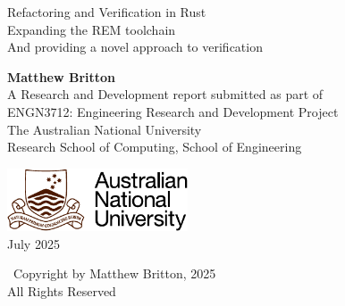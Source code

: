 \documentclass[oneside,onecolumn,12pt,a4paper,openany]{book}
\newcommand{\thesistitle}{Refactoring and Verification in Rust}
\newcommand{\thesistitletwo}{Expanding the REM toolchain }
\newcommand{\thesistitlethree}{And providing a novel approach to verification}
\newcommand{\fullname}{Matthew Britton}
\newcommand{\thesisdate}{July 2025}
\newcommand{\thesisyear}{2025}
\begin{document}
\setlength{\epigraphwidth}{12cm}
\setlength{\afterepigraphskip}{1.5cm}
\renewcommand{\epigraphsize}{\small}
\renewcommand{\epigraphrule}{1pt}
\renewcommand{\epigraphflush}{flushright}
\pagestyle{empty}

%

\begin{titlepage}
	\begin{center}
		\vspace*{0cm}
		{ \fontsize{20}{10} \selectfont \thesistitle} \\
		\vspace{0.3cm}
		{ \fontsize{20}{10} \selectfont \thesistitletwo} \\
            \vspace{0.3cm}
		{ \fontsize{20}{10} \selectfont \thesistitlethree}

		\vspace{2.0cm}
		{\bf \huge \fullname}\\
		\vspace{2cm}
		{\large A Research and Development report submitted as part of }\\
		\vspace{0.5cm}
		{\large ENGN3712: Engineering Research and Development Project}\\
		\vspace{0.5cm}
		{\large The Australian National University}\\
		\vspace{0.5cm}
		{ \large Research School of Computing, School of Engineering} \par
		\vspace{2.0cm}
		\includegraphics[width=0.4\textwidth]{anu-logo-colour.pdf}\\
		\vspace{2.0cm}
		{\large \thesisdate}

		\vspace{1.75cm}
		{\large  \textcopyright\ Copyright by \fullname,  \thesisyear \\}
		\vspace{0.5cm}
		{\large All Rights Reserved}
	\end{center}
\end{titlepage}
\end{document}
